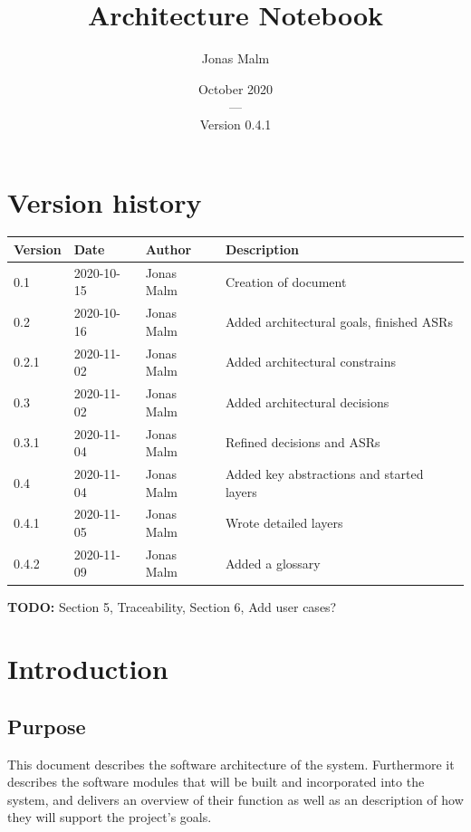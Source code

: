 \documentclass{article}
\title{Architecture Notebook}
\author{Jonas Malm}
\date{October 2020\\---\\Version 0.4.1}
\begin{document}
\maketitle
\clearpage

\begin{table}
\section*{Version history}
\centering
\begin{tabular}{|l|l|l|l|}
\hline
Version & Date & Author & Description \\ \hline
0.1 & 2020-10-15 & Jonas Malm & Creation of document\\ 
0.2 & 2020-10-16 & Jonas Malm & Added architectural goals, finished ASRs\\
0.2.1 & 2020-11-02 & Jonas Malm & Added architectural constrains\\ 
0.3 & 2020-11-02 & Jonas Malm & Added architectural decisions\\
0.3.1 & 2020-11-04 & Jonas Malm & Refined decisions and ASRs\\
0.4 & 2020-11-04 & Jonas Malm & Added key abstractions and started layers\\
0.4.1 & 2020-11-05 & Jonas Malm & Wrote detailed layers\\
0.4.2 & 2020-11-09 & Jonas Malm & Added a glossary\\

\hline
\end{tabular}
\end{table}
\textbf{TODO:} Section 5, Traceability, Section 6, Add user cases?

\clearpage

\tableofcontents
\clearpage

\section{Introduction}
\subsection{Purpose}
This document describes the software architecture of the system. Furthermore it describes the software modules that will be built and incorporated into the system, and delivers an overview of their function as well as an description of how they will support the project's goals.
\end{document}
